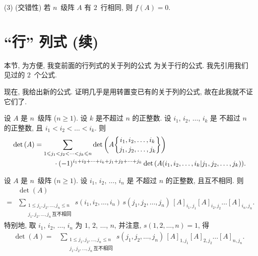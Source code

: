 \documentclass[../libro.tex]{subfiles}
\begin{document}
\begin{definition}
    (3)
    (交错性)
    若 \(n\)~级阵 \(A\) 有 \(2\)~行相同,
    则 \(f(A) = 0\).
\end{definition}

\KunAsteriskoEnEnhavtabelo
\section{\texorpdfstring{``行'' 列式 (续)}%
{"行" 列式 (续)}}
\SenAsteriskoEnEnhavtabelo

\maldevigalegajxo

本节, 为方便,
我变前面的行列式的关于列的公式%
为关于行的公式.
我先引用我们见过的 \(2\)~个公式.

\TheoremExpansionAboutRowOne*

\TheoremExpansionAboutAnyRow*

现在, 我给出新的公式.
证明几乎是用转置变已有的关于列的公式,
故在此我就不证它们了.

\begin{theorem}
    设 \(A\) 是 \(n\)~级阵 (\(n \geq 1\)).
    设 \(k\) 是不超过 \(n\) 的正整数.
    设 \(i_1\), \(i_2\), \(\dots\), \(i_k\) 是%
    不超过 \(n\) 的正整数,
    且 \(i_1 < i_2 < \dots < i_k\).
    则
    \begin{align*}
        &
        \det {(A)}
        = \sum_{1 \leq j_1 < j_2 < \dots < j_k \leq n}
        {\det {\left(
                    A\submat{i_1, i_2, \dots, i_k}
                    {j_1, j_2, \dots, j_k}
        \right)}}
        \\
        &
        \qquad \qquad \qquad
        \cdot (-1)^{i_1 + i_2 + \dots + i_k
        + j_1 + j_2 + \dots + j_k}
        \det {(A({i_1,i_2,\dots,i_k}|{j_1,j_2,\dots,j_k}))}.
    \end{align*}
\end{theorem}

\begin{theorem}
    设 \(A\) 是 \(n\)~级阵 (\(n \geq 1\)).
    设 \(i_1\), \(i_2\), \(\dots\), \(i_n\) 是%
    不超过 \(n\) 的正整数,
    且互不相同.
    则
    \begin{align*}
        & \det {(A)} \\
        = {} &
        \sum_{\substack{
                1 \leq j_1, j_2, \dots, j_n \leq n \\
                j_1, j_2, \dots, j_n\,\text{互不相同}
        }}
        {s(i_1, i_2, \dots, i_n)\,
            s(j_1, j_2, \dots, j_n)\,
        [A]_{i_1,j_1} [A]_{i_2,j_2} \dots [A]_{i_n,j_n}}.
    \end{align*}
    特别地, 取 \(i_1\), \(i_2\), \(\dots\), \(i_n\)
    为 \(1\), \(2\), \(\dots\), \(n\),
    并注意, \(s(1, 2, \dots, n) = 1\),
    得
    \begin{align*}
        \det {(A)}
        = {} &
        \sum_{\substack{
                1 \leq j_1, j_2, \dots, j_n \leq n \\
                j_1, j_2, \dots, j_n\,\text{互不相同}
        }}
        { s(j_1, j_2, \dots, j_n)\,
        [A]_{1,j_1} [A]_{2,j_2} \dots [A]_{n,j_n}}.
    \end{align*}
\end{theorem}
\end{document}
